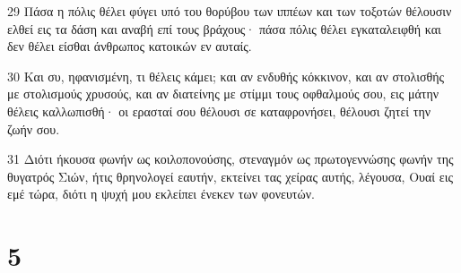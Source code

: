 \par 29 Πάσα η πόλις θέλει φύγει υπό του θορύβου των ιππέων και των τοξοτών θέλουσιν ελθεί εις τα δάση και αναβή επί τους βράχους· πάσα πόλις θέλει εγκαταλειφθή και δεν θέλει είσθαι άνθρωπος κατοικών εν αυταίς.
\par 30 Και συ, ηφανισμένη, τι θέλεις κάμει; και αν ενδυθής κόκκινον, και αν στολισθής με στολισμούς χρυσούς, και αν διατείνης με στίμμι τους οφθαλμούς σου, εις μάτην θέλεις καλλωπισθή· οι ερασταί σου θέλουσι σε καταφρονήσει, θέλουσι ζητεί την ζωήν σου.
\par 31 Διότι ήκουσα φωνήν ως κοιλοπονούσης, στεναγμόν ως πρωτογεννώσης φωνήν της θυγατρός Σιών, ήτις θρηνολογεί εαυτήν, εκτείνει τας χείρας αυτής, λέγουσα, Ουαί εις εμέ τώρα, διότι η ψυχή μου εκλείπει ένεκεν των φονευτών.

\chapter{5}

